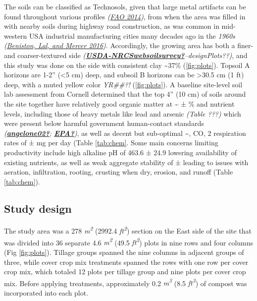 \documentclass[
]{article}
\begin{document}
The soils can be classified as Technosols, given that large metal artifacts can be found throughout various profiles \emph{(\protect\hyperlink{ref-fao14}{FAO 2014})}, from when the area was filled in with nearby soils during highway road construction, as was common in mid-western USA industrial manufacturing cities many decades ago in the \emph{1960s} \emph{(\protect\hyperlink{ref-beniston16}{Beniston, Lal, and Mercer 2016})}.
Accordingly, the growing area has both a finer- and coarser-textured side \emph{(\protect\hyperlink{ref-USDA-NRCSwebsoilsurvey}{\textbf{USDA-NRCSwebsoilsurvey?}}--designPlots??)},
and this study was done on the side with consistent clay \textasciitilde37\% (\ref{fig:plots}).
Topsoil A horizons are 1-2'' (\textless5 cm) deep, and subsoil B horizons can be \textgreater30.5 cm (1 ft) deep, with a muted yellow color \emph{YR\#\#?!} (\ref{fig:plots}).
A baseline site-level soil lab assessment from Cornell determined that the top 4'' (10 cm) of soils around the site together have relatively good organic matter at \textasciitilde{} ± \% and nutrient levels, including those of heavy metals like lead and arsenic \emph{(Table ???)} which were present below harmful government human-contact standards \emph{(\protect\hyperlink{ref-angelone02}{\textbf{angelone02?}}; \protect\hyperlink{ref-EPA}{\textbf{EPA?}})}, as well as decent but sub-optimal \textasciitilde, CO, 2 respiration rates of ± mg per day (Table \ref{tab:chem}.
Some main concerns limiting productivity include high alkaline pH of 463.6 ± 24.9 lowering availability of existing nutrients, as well as weak aggregate stability of ± leading to issues with aeration, infiltration, rooting, crusting when dry, erosion, and runoff (Table \ref{tab:chem}).

\hypertarget{study-design}{%
\subsection{Study design}\label{study-design}}

The study area was a 278 \emph{m\textsuperscript{2}} (2992.4 \emph{ft\textsuperscript{2}}) section on the East side of the site that was divided into 36 separate 4.6 \emph{m\textsuperscript{2}} (49.5 \emph{ft\textsuperscript{2}}) plots in nine rows and four columns (Fig \ref{fig:plots}).
Tillage groups spanned the nine columns in adjacent groups of three, while cover crop mix treatments spanned the rows with one row per cover crop mix, which totaled 12 plots per tillage group and nine plots per cover crop mix.
Before applying treatments, approximately 0.2 \emph{m\textsuperscript{3}} (8.5 \emph{ft\textsuperscript{3}}) of compost was incorporated into each plot.
\end{document}

